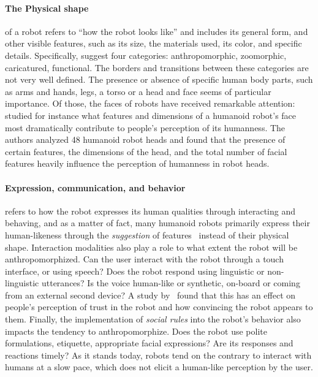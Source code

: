 \documentclass{frontiersSCNS} %
\begin{document}
\paragraph{The Physical shape} of a robot refers to ``how the robot looks like''
and includes its general form, and other visible features, such as its size, the
materials used, its color, and specific details. Specifically,
\cite{fong_survey_2003} suggest four categories: anthropomorphic, zoomorphic,
caricatured, functional. The borders and transitions between these categories
are not very well defined. The presence or absence of specific human body parts,
such as arms and hands, legs, a torso or a head and face seems of particular
importance. Of those, the faces of robots have received remarkable attention:
\cite{disalvo_all_2002} studied for instance what features and dimensions of a humanoid
robot's face most dramatically contribute to people's perception of its
humanness. The authors analyzed 48 humanoid robot heads and found that the
presence of certain features, the dimensions of the head, and the total number
of facial features heavily influence the perception of humanness in robot heads. 

\paragraph{Expression, communication, and behavior} refers to how the robot
expresses its human qualities through interacting and behaving, and as a matter
of fact, many humanoid robots primarily express their human-likeness through the
\textit{suggestion} of features~\citep{disalvo_all_2002} instead of their
physical shape. Interaction modalities also play a role to what extent the robot
will be anthropomorphized. Can the user interact with the robot through a touch
interface, or using speech? Does the robot respond using linguistic or
non-linguistic utterances? Is the voice human-like or synthetic, on-board or
coming from an external second device? A study by~\cite{takayama_im_2009} found
that this has an effect on people's perception of trust in the robot and how
convincing the robot appears to them.  Finally, the implementation of \emph{social
rules} into the robot's behavior also impacts the tendency to anthropomorphize. Does the
robot use polite formulations, etiquette, appropriate facial expressions? Are
its responses and reactions timely? As it stands today, robots tend on the
contrary to interact with humans at a slow pace, which does not elicit a
human-like perception by the user.
\end{document}

